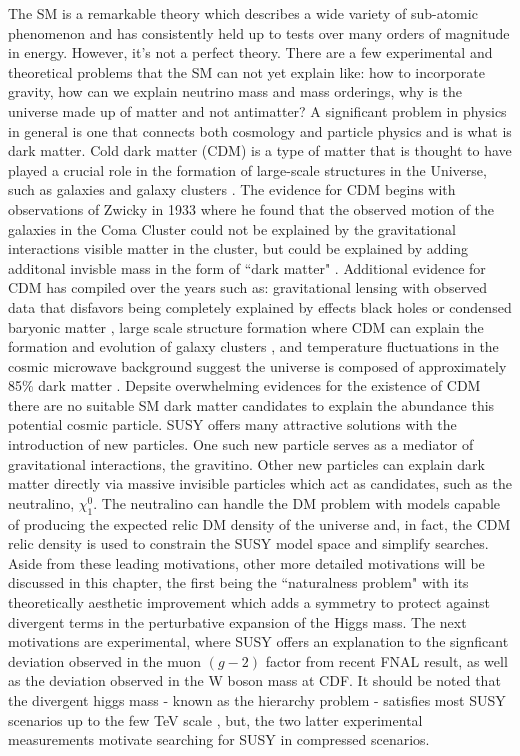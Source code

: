 The SM is a remarkable theory which describes a wide variety of sub-atomic phenomenon and has consistently held up to tests over many orders of magnitude in energy. However, it's not a perfect theory. There are a few  experimental and theoretical problems that the SM can not yet explain like: how to incorporate gravity,  how can we explain neutrino mass and mass orderings, why is the universe made up of matter and not antimatter?  
A significant problem in physics in general is one that connects both cosmology and particle physics and is what is dark matter. Cold dark matter (CDM) is a type of matter that is thought to have played a crucial role in the formation of large-scale structures in the Universe, such as galaxies and galaxy clusters \cite{Garrett:2010hd}. The evidence for CDM begins with observations of Zwicky in 1933 where he found that the observed motion of the galaxies in the Coma Cluster could not be explained by the gravitational interactions visible matter in the cluster, but could be explained by adding additonal invisble mass in the form of ``dark matter" \cite{Zwicky:1933gu}. Additional evidence for CDM has compiled over the years such as: gravitational lensing with observed data that disfavors being completely explained by effects black holes or condensed baryonic matter \cite{Massey:2007lens}, large scale structure formation where CDM can explain the formation and evolution of galaxy clusters \cite{Springel:2005}, and temperature fluctuations in the cosmic microwave background suggest the universe is composed of approximately 85\% dark matter \cite{Planck:2018vyg}. Depsite overwhelming evidences for the existence of CDM there are no suitable SM dark matter candidates to explain the abundance this potential cosmic particle. SUSY offers many attractive solutions with the introduction of new particles. One such new particle serves as a mediator of gravitational interactions, the gravitino. Other new particles can explain dark matter directly via massive invisible particles which act as candidates, such as the neutralino, $\chi_1^0$. The neutralino can handle the DM problem with models capable of producing the expected relic DM density of the universe and, in fact, the CDM relic density is used to constrain the SUSY model space and simplify searches. Aside from these leading motivations, other more detailed motivations will be discussed in this chapter, the first being the ``naturalness problem" with its theoretically aesthetic improvement which adds a symmetry to protect against divergent terms in the perturbative expansion of the Higgs mass. The next motivations are experimental, where SUSY offers an explanation to the signficant deviation observed in the muon $(g-2)$ factor from recent FNAL result, as well as the deviation observed in the W boson mass at CDF. It should be noted that the divergent higgs mass - known as the hierarchy problem - satisfies most SUSY scenarios up to the few TeV scale \cite{Barbieri:1987fn}, but, the two latter experimental measurements motivate searching for SUSY in compressed scenarios.



